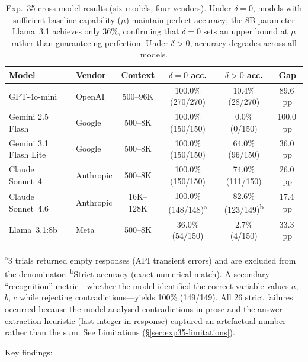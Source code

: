 \documentclass[11pt,a4paper]{article}
\begin{document}
\begin{table}[h]
\centering
\small
\begin{tabular}{llcccc}
\toprule
\textbf{Model} & \textbf{Vendor} & \textbf{Context} & \textbf{$\delta = 0$ acc.} & \textbf{$\delta > 0$ acc.} & \textbf{Gap} \\
\midrule
GPT-4o-mini           & OpenAI    & 500--96K   & 100.0\% (270/270) & 10.4\% (28/270)   & 89.6\,pp \\
Gemini 2.5 Flash      & Google    & 500--8K    & 100.0\% (150/150) & 0.0\% (0/150)     & 100.0\,pp \\
Gemini 3.1 Flash Lite & Google    & 500--8K    & 100.0\% (150/150) & 64.0\% (96/150)   & 36.0\,pp \\
Claude Sonnet~4       & Anthropic & 500--8K    & 100.0\% (150/150) & 74.0\% (111/150)  & 26.0\,pp \\
Claude Sonnet~4.6     & Anthropic & 16K--128K  & 100.0\% (148/148)\textsuperscript{a} & 82.6\% (123/149)\textsuperscript{b} & 17.4\,pp \\
Llama~3.1:8b          & Meta      & 500--8K    & 36.0\% (54/150)   & 2.7\% (4/150)     & 33.3\,pp \\
\bottomrule
\end{tabular}

\vspace{2pt}
{\footnotesize \textsuperscript{a}3 trials returned empty responses (API transient errors) and are excluded from the denominator.
\textsuperscript{b}Strict accuracy (exact numerical match). A secondary ``recognition'' metric---whether the model identified the correct variable values $a$, $b$, $c$ while rejecting contradictions---yields 100\% (149/149). All 26 strict failures occurred because the model analysed contradictions in prose and the answer-extraction heuristic (last integer in response) captured an artefactual number rather than the sum. See Limitations (\S\ref{sec:exp35-limitations}).}

\caption{Exp.~35 cross-model results (six models, four vendors). Under $\delta = 0$, models with sufficient baseline capability ($\mu$) maintain perfect accuracy; the 8B-parameter Llama~3.1 achieves only 36\%, confirming that $\delta = 0$ sets an upper bound at $\mu$ rather than guaranteeing perfection. Under $\delta > 0$, accuracy degrades across all models.}
\label{tab:exp35}
\end{table}

\noindent Key findings:
\end{document}
